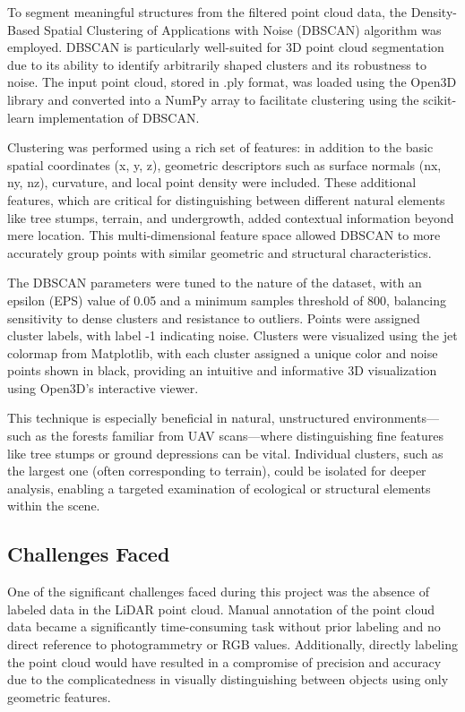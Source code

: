 \documentclass[../report.tex]{subfiles}
\begin{document}
    To segment meaningful structures from the filtered point cloud data, the Density-Based Spatial Clustering of Applications with Noise (DBSCAN)\cite{DBSCan_Grammarly} algorithm was employed. DBSCAN is particularly well-suited for 3D point cloud segmentation due to its ability to identify arbitrarily shaped clusters and its robustness to noise. The input point cloud, stored in .ply format, was loaded using the Open3D library and converted into a NumPy array to facilitate clustering using the scikit-learn implementation of DBSCAN.
    
    Clustering was performed using a rich set of features: in addition to the basic spatial coordinates (x, y, z), geometric descriptors such as surface normals (nx, ny, nz), curvature, and local point density were included. These additional features, which are critical for distinguishing between different natural elements like tree stumps, terrain, and undergrowth, added contextual information beyond mere location. This multi-dimensional feature space allowed DBSCAN to more accurately group points with similar geometric and structural characteristics.
    
    The DBSCAN parameters were tuned to the nature of the dataset, with an epsilon\cite{dbscan_eps} (EPS) value of 0.05 and a minimum samples threshold of 800, balancing sensitivity to dense clusters and resistance to outliers. Points were assigned cluster labels, with label -1\cite{dbscan_eps2} indicating noise. Clusters were visualized using the jet colormap from Matplotlib, with each cluster assigned a unique color and noise points shown in black, providing an intuitive and informative 3D visualization using Open3D’s interactive viewer.
    
    This technique is especially beneficial in natural, unstructured environments—such as the forests familiar from UAV scans—where distinguishing fine features like tree stumps or ground depressions can be vital. Individual clusters, such as the largest one (often corresponding to terrain), could be isolated for deeper analysis, enabling a targeted examination of ecological or structural elements within the scene.
        
	\subsection{Challenges Faced}
    One of the significant challenges faced during this project was the absence of labeled data in the LiDAR point cloud. Manual annotation of the point cloud data became a significantly time-consuming task without prior labeling and no direct reference to photogrammetry or RGB values. Additionally, directly labeling the point cloud would have resulted in a compromise of precision and accuracy due to the complicatedness in visually distinguishing between objects using only geometric features.
\end{document}
